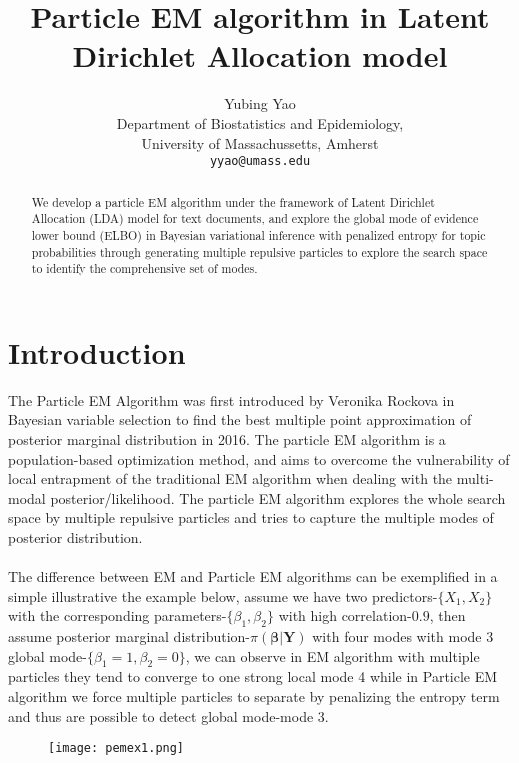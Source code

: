 \documentclass{article}
\title{Particle EM algorithm in Latent Dirichlet Allocation model}
\author{
Yubing Yao\\
Department of Biostatistics and Epidemiology,\\
University of Massachussetts, Amherst\\
\texttt{yyao@umass.edu}
}
\newcommand{\bs}{\boldsymbol}
\begin{document}

\maketitle


\begin{abstract}
 We develop a particle EM algorithm under the framework of Latent Dirichlet Allocation (LDA) model for text documents, and explore the global mode of evidence lower bound (ELBO) in Bayesian variational inference with penalized entropy for topic probabilities through generating multiple repulsive  particles to explore the search space to identify the comprehensive set of modes. 
\end{abstract}

\section{Introduction}
The Particle EM Algorithm was first introduced by Veronika Rockova in Bayesian variable selection to find the best multiple point approximation of posterior marginal distribution in 2016. The particle EM algorithm is a population-based optimization method, and aims to overcome the vulnerability of local entrapment of the traditional EM algorithm when dealing with the multi-modal posterior/likelihood. The particle EM algorithm explores the whole search space by multiple repulsive particles and tries to capture the multiple modes of posterior distribution. \\
\\
The difference between EM  and Particle EM algorithms can be exemplified in a simple illustrative the example below, assume we have two predictors-$\{X_1,X_2\}$ with the corresponding parameters-$\{\beta_1,\beta_2\}$ with high correlation-$0.9$, then assume posterior marginal distribution-$\pi(\bs{\beta}|\bs{Y})$ with four modes with mode 3 global mode-$\{\beta_1=1,\beta_2=0\}$, we can observe in EM algorithm with multiple particles they tend to converge to one strong local mode 4 while in Particle EM algorithm we force multiple particles to separate by penalizing the entropy term and thus are possible to detect global mode-mode 3.\\
	\begin{figure}[!hbt]
		\texttt{[image: pemex1.png]}
		\centering
	\end{figure}
\end{document}
